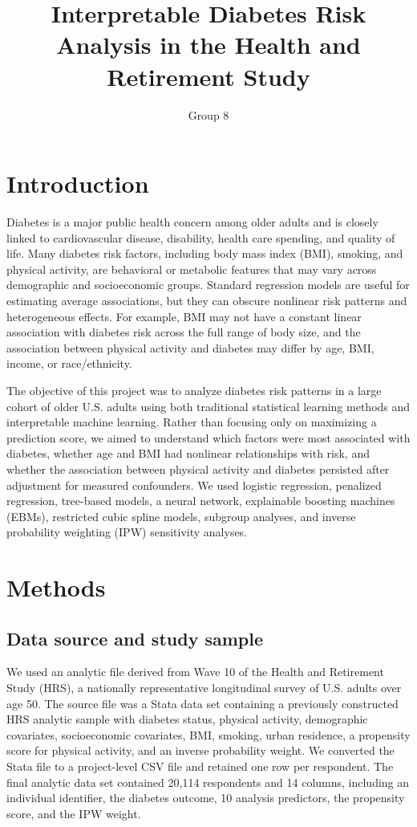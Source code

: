 \documentclass[10pt]{article}
\title{\vspace{-1.0cm}Interpretable Diabetes Risk Analysis in the Health and Retirement Study}
\author{Group 8}
\date{}
\begin{document}
\maketitle
\vspace{-0.8cm}

\section*{Introduction}

Diabetes is a major public health concern among older adults and is closely linked to cardiovascular disease, disability, health care spending, and quality of life. Many diabetes risk factors, including body mass index (BMI), smoking, and physical activity, are behavioral or metabolic features that may vary across demographic and socioeconomic groups. Standard regression models are useful for estimating average associations, but they can obscure nonlinear risk patterns and heterogeneous effects. For example, BMI may not have a constant linear association with diabetes risk across the full range of body size, and the association between physical activity and diabetes may differ by age, BMI, income, or race/ethnicity.

The objective of this project was to analyze diabetes risk patterns in a large cohort of older U.S. adults using both traditional statistical learning methods and interpretable machine learning. Rather than focusing only on maximizing a prediction score, we aimed to understand which factors were most associated with diabetes, whether age and BMI had nonlinear relationships with risk, and whether the association between physical activity and diabetes persisted after adjustment for measured confounders. We used logistic regression, penalized regression, tree-based models, a neural network, explainable boosting machines (EBMs), restricted cubic spline models, subgroup analyses, and inverse probability weighting (IPW) sensitivity analyses.

\section*{Methods}

\subsection*{Data source and study sample}

We used an analytic file derived from Wave 10 of the Health and Retirement Study (HRS), a nationally representative longitudinal survey of U.S. adults over age 50. The source file was a Stata data set containing a previously constructed HRS analytic sample with diabetes status, physical activity, demographic covariates, socioeconomic covariates, BMI, smoking, urban residence, a propensity score for physical activity, and an inverse probability weight. We converted the Stata file to a project-level CSV file and retained one row per respondent. The final analytic data set contained 20,114 respondents and 14 columns, including an individual identifier, the diabetes outcome, 10 analysis predictors, the propensity score, and the IPW weight.
\end{document}
